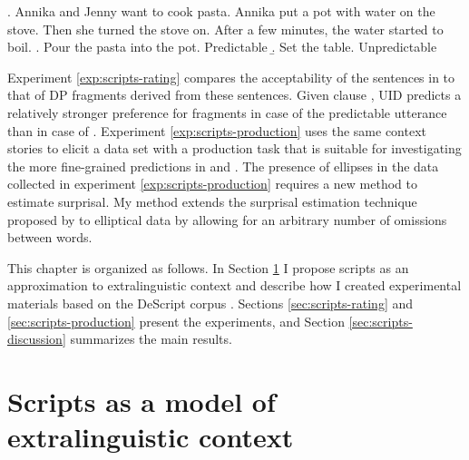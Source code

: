 \ex. Annika and Jenny want to cook pasta. Annika put a pot with water on the stove. Then she turned the stove on. After a few minutes, the water started to boil.
\a. Pour the pasta into the pot. \hfill Predictable
\b. Set the table. \hfill Unpredictable

Experiment \ref{exp:scripts-rating} compares the acceptability of the sentences in \Last[a,b] to that of DP fragments derived from these sentences. Given clause \LLast[c], UID predicts a relatively stronger preference for fragments in case of the predictable utterance \Last[a]  than in case of \Last[b]. Experiment \ref{exp:scripts-production} uses the same context stories to elicit a data set with a production task that is suitable for investigating the more fine-grained predictions in \LLast[a] and \LLast[b]. The presence of ellipses in the data collected in experiment \ref{exp:scripts-production} requires a new method to estimate surprisal. My method extends the surprisal estimation technique proposed by \citet{hale2001} to elliptical data by allowing for an arbitrary number of omissions between words.

This chapter is organized as follows. In Section \ref{sec:infotheory-scripts} I propose scripts as an approximation to extralinguistic context and describe how I created experimental materials based on the DeScript corpus \citep{wanzare.etal2016}. Sections \ref{sec:scripts-rating} and \ref{sec:scripts-production} present the experiments, and Section \ref{sec:scripts-discussion} summarizes the main results.

\section{Scripts as a model of extralinguistic context}
\label{sec:infotheory-scripts}

